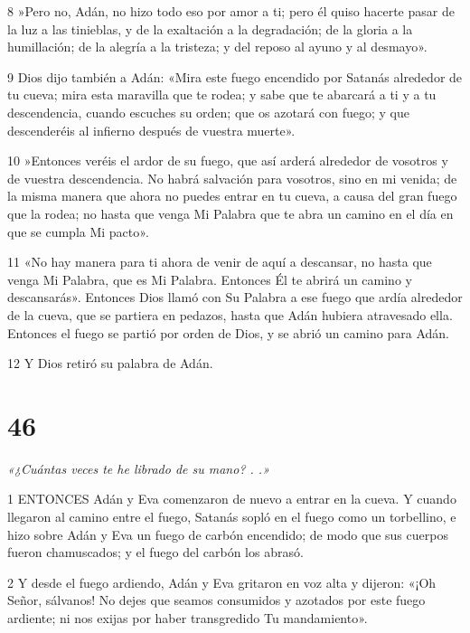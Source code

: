 \par 8 »Pero no, Adán, no hizo todo eso por amor a ti; pero él quiso hacerte pasar de la luz a las tinieblas, y de la exaltación a la degradación; de la gloria a la humillación; de la alegría a la tristeza; y del reposo al ayuno y al desmayo».

\par 9 Dios dijo también a Adán: «Mira este fuego encendido por Satanás alrededor de tu cueva; mira esta maravilla que te rodea; y sabe que te abarcará a ti y a tu descendencia, cuando escuches su orden; que os azotará con fuego; y que descenderéis al infierno después de vuestra muerte».

\par 10 »Entonces veréis el ardor de su fuego, que así arderá alrededor de vosotros y de vuestra descendencia. No habrá salvación para vosotros, sino en mi venida; de la misma manera que ahora no puedes entrar en tu cueva, a causa del gran fuego que la rodea; no hasta que venga Mi Palabra que te abra un camino en el día en que se cumpla Mi pacto».

\par 11 «No hay manera para ti ahora de venir de aquí a descansar, no hasta que venga Mi Palabra, que es Mi Palabra. Entonces Él te abrirá un camino y descansarás». Entonces Dios llamó con Su Palabra a ese fuego que ardía alrededor de la cueva, que se partiera en pedazos, hasta que Adán hubiera atravesado ella. Entonces el fuego se partió por orden de Dios, y se abrió un camino para Adán.

\par 12 Y Dios retiró su palabra de Adán.

\chapter{46}

\par \textit{«¿Cuántas veces te he librado de su mano? . .»}

\par 1 ENTONCES Adán y Eva comenzaron de nuevo a entrar en la cueva. Y cuando llegaron al camino entre el fuego, Satanás sopló en el fuego como un torbellino, e hizo sobre Adán y Eva un fuego de carbón encendido; de modo que sus cuerpos fueron chamuscados; y el fuego del carbón los abrasó.

\par 2 Y desde el fuego ardiendo, Adán y Eva gritaron en voz alta y dijeron: «¡Oh Señor, sálvanos! No dejes que seamos consumidos y azotados por este fuego ardiente; ni nos exijas por haber transgredido Tu mandamiento».

